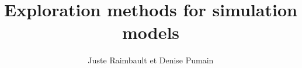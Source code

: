 \documentclass[10pt]{article}
\title{Exploration methods for simulation models}
\author{Juste Raimbault et Denise Pumain}
\date{}
\begin{document}
	

\maketitle

\begin{abstract}

\end{abstract}
\end{document}

